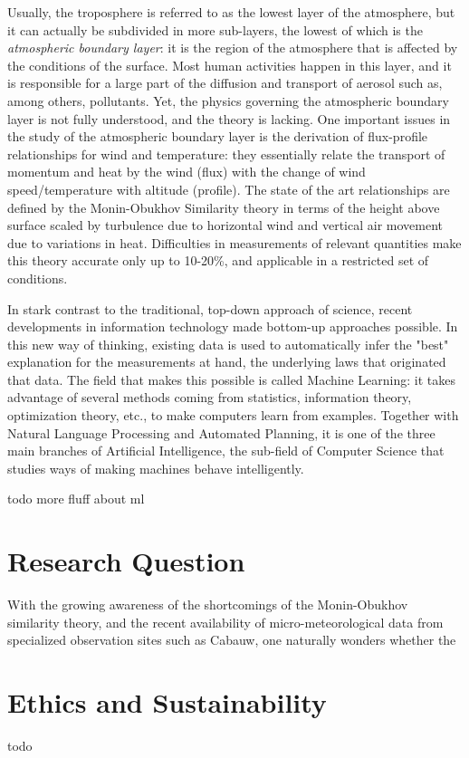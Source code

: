 \documentclass[12pt]{book}
\begin{document}
Usually, the troposphere is referred to as the lowest layer of the atmosphere, but it can actually be subdivided in more sub-layers, the lowest of which is the \emph{atmospheric boundary layer}: it is the region of the atmosphere that is affected by the conditions of the surface. Most human activities happen in this layer, and it is responsible for a large part of the diffusion and transport of aerosol such as, among others, pollutants. Yet, the physics governing the atmospheric boundary layer is not fully understood, and the theory is lacking. One important issues in the study of the atmospheric boundary layer is the derivation of flux-profile relationships for wind and temperature: they essentially relate the transport of momentum and heat by the wind (flux) with the  change of wind speed/temperature with altitude (profile). The state of the art relationships are defined by the Monin-Obukhov Similarity theory in terms of the height above surface scaled by turbulence due to horizontal wind and vertical air movement due to variations in heat. Difficulties in measurements of relevant quantities make this theory accurate only up to 10-20\%, and applicable in a restricted set of conditions. 

In stark contrast to the traditional, top-down approach of science, recent developments in information technology made bottom-up approaches possible. In this new way of thinking, existing data is used to automatically infer the "best" explanation for the measurements at hand, the underlying laws that originated that data. The field that makes this possible is called Machine Learning: it takes advantage of several methods coming from statistics, information theory, optimization theory, etc., to make computers learn from examples. Together with Natural Language Processing and Automated Planning, it is one of the three main branches of Artificial Intelligence, the sub-field of Computer Science that studies ways of making machines behave intelligently.

todo more fluff about ml

\section{Research Question}
With the growing awareness of the shortcomings of the Monin-Obukhov similarity theory, and the recent availability of micro-meteorological data from specialized observation sites such as Cabauw, one naturally wonders whether the 

\section{Ethics and Sustainability}
todo
\end{document}
